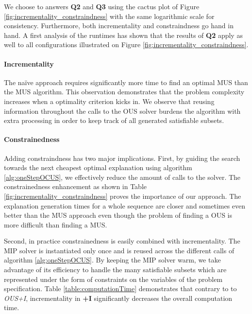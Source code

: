 We choose to answers \textbf{Q2} and \textbf{Q3} using the cactus plot of Figure \ref{fig:incrementality_constraindness} with the same logarithmic scale for consistency. Furthermore, both incrementality and constraindness go hand in hand.
A first analysis of the runtimes has shown that the results of \textbf{Q2} apply as well to all configurations illustrated on Figure \ref{fig:incrementality_constraindness}.

\paragraph{Incrementality}

The naïve \omus approach requires significantly more time to find an optimal MUS than the MUS algorithm. This observation demonstrates that the problem complexity increases when a optimality criterion kicks in. We observe that reusing information throughout the calls to the OUS solver burdens the \onestep algorithm with extra processing in order to keep track of all generated satisfiable subsets.


\paragraph{Constrainedness}
Adding constraindness has two major implications.
First, by guiding the search towards the next cheapest optimal explanation using algorithm \ref{alg:oneStepOCUS}, we effectively reduce the amount of calls to the \omus solver.
The constrainedness enhancement as shown in Table \ref{fig:incrementality_constraindness} proves the importance of our approach.
The explanation generation times for a whole sequence are closer and sometimes even better than the MUS approach even though the problem of finding a OUS is more difficult than finding a MUS.

Second, in practice constrainedness is easily combined with incrementality.
The MIP solver is instantiated only once and is reused across the different \onestep calls of algorithm \ref{alg:oneStepOCUS}.
By keeping the MIP solver warm, we take advantage of its efficiency to handle the many satisfiable subsets which are represented under the form of constraints on the variables of the problem specification.
Table \ref{table:computationTime} demonstrates that contrary to to \emph{OUS+I}, incrementality in \textbf{\comus+I} significantly decreases the overall computation time.








